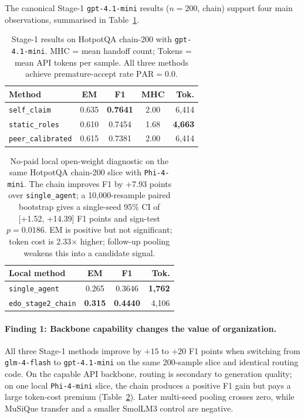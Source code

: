\documentclass[11pt]{article}
\begin{document}
The canonical Stage-1 \texttt{gpt-4.1-mini} results ($n=200$, chain) support four main observations, summarised in Table~\ref{tab:main-results}.

\begin{table}[t]
\centering
\small
\setlength{\tabcolsep}{3pt}
\begin{tabular}{@{}lcccr@{}}
\toprule
\textbf{Method} & \textbf{EM} & \textbf{F1} & \textbf{MHC} & \textbf{Tok.} \\
\midrule
\texttt{self\_claim}     & 0.635 & \textbf{0.7641} & 2.00 & 6{,}414 \\
\texttt{static\_roles}   & 0.610 & 0.7454 & 1.68 & \textbf{4{,}663} \\
\texttt{peer\_calibrated}& 0.615 & 0.7381 & 2.00 & 6{,}414 \\
\bottomrule
\end{tabular}
\caption{Stage-1 results on HotpotQA chain-200 with \texttt{gpt-4.1-mini}. MHC = mean handoff count; Tokens = mean API tokens per sample. All three methods achieve premature-accept rate $\mathrm{PAR}=0.0$.}
\label{tab:main-results}
\end{table}

\begin{table}[t]
\centering
\small
\setlength{\tabcolsep}{3pt}
\begin{tabular}{@{}lccr@{}}
\toprule
\textbf{Local method} & \textbf{EM} & \textbf{F1} & \textbf{Tok.} \\
\midrule
\texttt{single\_agent}      & 0.265 & 0.3646 & \textbf{1{,}762} \\
\texttt{edo\_stage2\_chain} & \textbf{0.315} & \textbf{0.4440} & 4{,}106 \\
\bottomrule
\end{tabular}
\caption{No-paid local open-weight diagnostic on the same HotpotQA chain-200 slice with \texttt{Phi-4-mini}. The chain improves F1 by +7.93 points over \texttt{single\_agent}; a 10,000-resample paired bootstrap gives a single-seed 95\% CI of [+1.52, +14.39] F1 points and sign-test $p{=}0.0186$. EM is positive but not significant; token cost is 2.33$\times$ higher; follow-up pooling weakens this into a candidate signal.}
\label{tab:local-phi4}
\end{table}

\paragraph{Finding 1: Backbone capability changes the value of organization.} All three Stage-1 methods improve by $+15$ to $+20$ F1 points when switching from \texttt{glm-4-flash} to \texttt{gpt-4.1-mini} on the same 200-sample slice and identical routing code. On the capable API backbone, routing is secondary to generation quality; on one local \texttt{Phi-4-mini} slice, the chain produces a positive F1 gain but pays a large token-cost premium (Table~\ref{tab:local-phi4}). Later multi-seed pooling crosses zero, while MuSiQue transfer and a smaller SmolLM3 control are negative.
\end{document}
